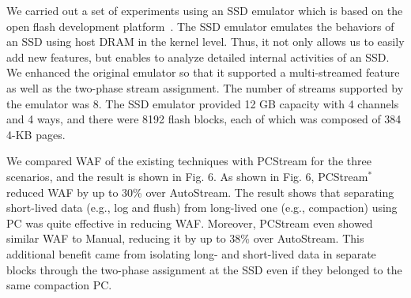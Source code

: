 We carried out a set of experiments using an SSD emulator which is based on the
open flash development platform~\cite{AMF}.  The SSD emulator emulates the
behaviors of an SSD using host DRAM in the kernel level. Thus, it not only
allows us to easily add new features, but enables to analyze detailed internal
activities of an SSD.  We enhanced the original emulator so that it supported a
multi-streamed feature as well as the two-phase stream assignment.  The number
of streams supported by the emulator was 8.  The SSD emulator provided 12 GB
capacity with 4 channels and 4 ways, and there were 8192 flash blocks, each of
which was composed of 384 4-KB pages.  

We compared WAF of the existing techniques with \textsf{\small PCStream} for the three
scenarios, and the result is shown in Fig. 6.  As shown in
Fig. 6, \textsf{\small PCStream$^*$} reduced WAF by up to 30\% over
\textsf{\small AutoStream}.  The result shows that separating short-lived data (e.g.,
log and flush) from long-lived one (e.g., compaction) using PC was quite
effective in reducing WAF.  Moreover, \textsf{\small PCStream} even showed similar WAF to
\textsf{\small Manual}, reducing it by up to 38\% over \textsf{\small AutoStream}.  This
additional benefit came from isolating long- and short-lived data in separate
blocks through the two-phase assignment at the SSD even if they belonged to the
same compaction PC.

